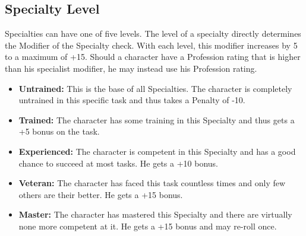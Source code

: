 \subsection{Specialty Level}\label{skill_level}
Specialties can have one of five levels. The level of a specialty directly determines the Modifier of the Specialty check. With each level, this modifier increases by 5 to a maximum of +15. Should a character have a Profession rating that is higher than his specialist modifier, he may instead use his Profession rating.
\begin{itemize}
	\item \textbf{Untrained:} This is the base of all Specialties. The character is completely untrained in this specific task and thus takes a Penalty of -10.
	\item \textbf{Trained:} The character has some training in this Specialty and thus gets a +5 bonus on the task.
	\item \textbf{Experienced:} The character is competent in this Specialty and has a good chance to succeed at most tasks. He gets a +10 bonus.
	\item \textbf{Veteran:} The character has faced this task countless times and only few others are their better. He gets a +15 bonus.
	\item \textbf{Master:} The character has mastered this Specialty and there are virtually none more competent at it. He gets a +15 bonus and may re-roll once.
\end{itemize}


